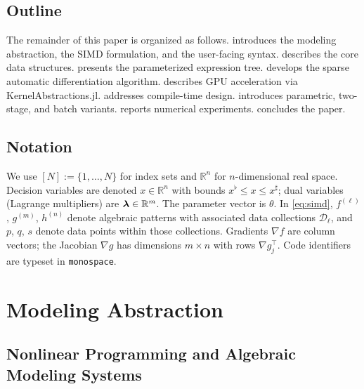 \documentclass[11pt]{article}
\begin{document}
\subsection{Outline}
\label{sec:intro:outline}
The remainder of this paper is organized as follows.  introduces the modeling abstraction, the SIMD formulation, and the user-facing syntax.  describes the core data structures.  presents the parameterized expression tree.  develops the sparse automatic differentiation algorithm.  describes GPU acceleration via KernelAbstractions.jl.  addresses compile-time design.  introduces parametric, two-stage, and batch variants.  reports numerical experiments.  concludes the paper.

\subsection{Notation}
\label{sec:intro:notation}
We use $[N] := \{1,\ldots,N\}$ for index sets and $\mathbb{R}^n$ for $n$-dimensional real space. Decision variables are denoted $x \in \mathbb{R}^n$ with bounds $x^\flat \leq x \leq x^\sharp$; dual variables (Lagrange multipliers) are $\boldsymbol{\lambda} \in \mathbb{R}^m$. The parameter vector is $\theta$. In \cref{eq:simd}, $f^{(\ell)}$, $g^{(m)}$, $h^{(n)}$ denote algebraic patterns with associated data collections $\mathcal{D}_\ell$, and $p$, $q$, $s$ denote data points within those collections. Gradients $\nabla f$ are column vectors; the Jacobian $\nabla g$ has dimensions $m \times n$ with rows $\nabla g_j^\top$. Code identifiers are typeset in \texttt{monospace}.

\section{Modeling Abstraction}
\label{sec:modeling}

\subsection{Nonlinear Programming and Algebraic Modeling Systems}
\label{sec:modeling:nlp}
\end{document}
